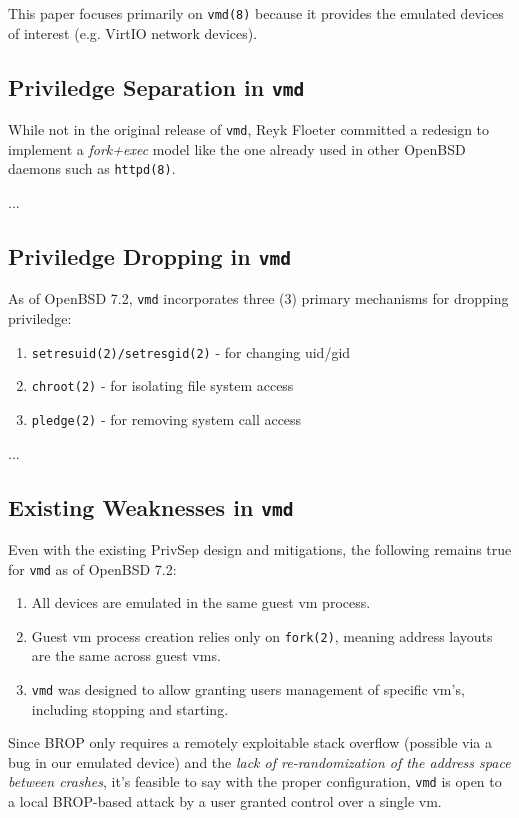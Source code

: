 \documentclass[conference]{IEEEtran}
\begin{document}
This paper focuses primarily on \texttt{vmd(8)} because it provides
the emulated devices of interest (e.g. VirtIO network devices).

\subsection{Priviledge Separation in \texttt{vmd}}
While not in the original release of \texttt{vmd}, Reyk Floeter
committed \cite{b6} a redesign to implement a \emph{fork+exec} model
like the one already used in other OpenBSD daemons such as
\texttt{httpd(8)}.

...

\subsection{Priviledge Dropping in \texttt{vmd}}
As of OpenBSD 7.2, \texttt{vmd} incorporates three (3) primary
mechanisms for dropping priviledge:

\begin{enumerate}
\item \texttt{setresuid(2)/setresgid(2)} - for changing uid/gid
\item \texttt{chroot(2)} - for isolating file system access
\item \texttt{pledge(2)} - for removing system call access
\end{enumerate}

...

\subsection{Existing Weaknesses in \texttt{vmd}}
Even with the existing PrivSep design and mitigations, the following
remains true for \texttt{vmd} as of OpenBSD 7.2:

\begin{enumerate}
\item All devices are emulated in the same guest vm process.
\item Guest vm process creation relies only on \texttt{fork(2)}, meaning address layouts are the same across guest vms.
\item \texttt{vmd} was designed to allow granting users management of specific vm's, including stopping and starting.
\end{enumerate}

Since BROP only requires a remotely exploitable stack overflow (possible via a bug in our emulated device) and the \emph{lack of re-randomization of the address space between crashes}, it's feasible to say with the proper configuration, \texttt{vmd} is open to a local BROP-based attack by a user granted control over a single vm.
\end{document}
